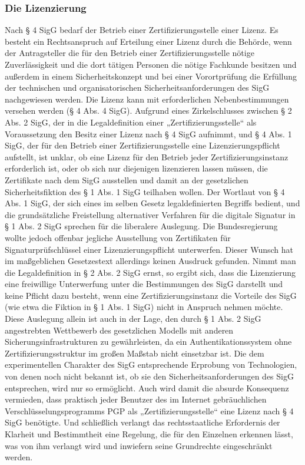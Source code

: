 \subsubsection{Die Lizenzierung}
Nach § 4 SigG bedarf der Betrieb einer Zertifizierungsstelle einer Lizenz. Es besteht ein Rechtsanspruch auf Erteilung einer Lizenz durch die Behörde, wenn der Antragsteller die für den Betrieb einer Zertifizierungsstelle nötige Zuverlässigkeit und die dort tätigen Personen die nötige Fachkunde besitzen und außerdem in einem Sicherheitskonzept und bei einer Vorortprüfung die Erfüllung der technischen und organisatorischen Sicherheitsanforderungen des SigG nachgewiesen werden. Die Lizenz kann mit erforderlichen Nebenbestimmungen versehen werden (§ 4 Abs. 4 SigG). Aufgrund eines Zirkelschlusses zwischen § 2 Abs. 2 SigG, der in die Legaldefinition einer „Zertifizierungsstelle“ als Voraussetzung den Besitz einer Lizenz nach § 4 SigG aufnimmt, und § 4 Abs. 1 SigG, der für den Betrieb einer Zertifizierungsstelle eine Lizenzierungspflicht aufstellt, ist unklar, ob eine Lizenz für den Betrieb jeder Zertifizierungsinstanz erforderlich ist, oder ob sich nur diejenigen lizenzieren lassen müssen, die Zertifikate nach dem SigG ausstellen und damit an der gesetzlichen Sicherheitsfiktion des § 1 Abs. 1 SigG teilhaben wollen. Der Wortlaut von § 4 Abs. 1 SigG, der sich eines im selben Gesetz legaldefinierten Begriffs bedient, und die grundsätzliche Freistellung alternativer Verfahren für die digitale Signatur in § 1 Abs. 2 SigG sprechen für die liberalere Auslegung. Die Bundesregierung wollte jedoch offenbar jegliche Ausstellung von Zertifikaten für Signaturprüfschlüssel einer Lizenzierungspflicht unterwerfen. Dieser Wunsch hat im maßgeblichen Gesetzestext allerdings keinen Ausdruck gefunden. Nimmt man die Legaldefinition in § 2 Abs. 2 SigG ernst, so ergibt sich, dass die Lizenzierung eine freiwillige Unterwerfung unter die Bestimmungen des SigG darstellt und keine Pflicht dazu besteht, wenn eine Zertifizierungsinstanz die Vorteile des SigG (wie etwa die Fiktion in § 1 Abs. 1 SigG) nicht in Anspruch nehmen möchte. Diese Auslegung allein ist auch in der Lage, den durch § 1 Abs. 2 SigG angestrebten Wettbewerb des gesetzlichen Modells mit anderen Sicherungsinfrastrukturen zu gewährleisten, da ein Authentikationssystem ohne Zertifizierungsstruktur im großen Maßstab nicht einsetzbar ist. Die dem experimentellen Charakter des SigG entsprechende Erprobung von Technologien, von denen noch nicht bekannt ist, ob sie den Sicherheitsanforderungen des SigG entsprechen, wird nur so ermöglicht. Auch wird damit die absurde Konsequenz vermieden, dass praktisch jeder Benutzer des im Internet gebräuchlichen Verschlüsselungsprogramms PGP als „Zertifizierungsstelle“ eine Lizenz nach § 4 SigG benötigte. Und schließlich verlangt das rechtsstaatliche Erfordernis der Klarheit und Bestimmtheit eine Regelung, die für den Einzelnen erkennen lässt, was von ihm verlangt wird und inwiefern seine Grundrechte eingeschränkt werden. \\
